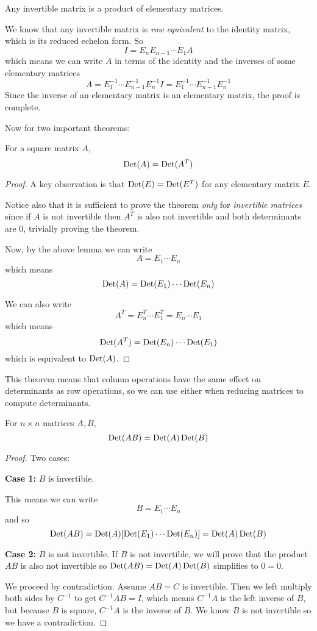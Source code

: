 \begin{lemma}
Any invertible matrix is a product of elementary matrices.
\end{lemma}

\begin{lproof}
We know that any invertible matrix is \textit{row equivalent} to the identity matrix, which is its reduced echelon form. So 
$$I = E_{n} E_{n-1} \cdots E_{1} A$$
which means we can write $A$ in terms of the identity and the inverses of some elementary  matrices 
$$A = E_{1}^{-1} \cdots E_{n-1}^{-1} E_{n}^{-1} I = E_{1}^{-1} \cdots E_{n-1}^{-1} E_{n}^{-1}$$
Since the inverse of an elementary matrix is an elementary matrix, the proof is complete. 
\end{lproof} 

Now for two important theorems:

\begin{theorem}
For a square matrix $A$, 
$$\operatorname{Det}(A) = \operatorname{Det}(A^{T})$$
\end{theorem}

\begin{proof}
A key observation is that $\operatorname{Det}(E) = \operatorname{Det}(E^{T})$ for any elementary matrix $E$. 

Notice also that it is sufficient to prove the theorem \textit{only} for \textit{invertible matrices} since if $A$ is not invertible then $A^{T}$ is also not invertible and both determinants are 0, trivially proving the theorem. 

Now, by the above lemma we can write
$$A = E_{1} \cdots E_{n}$$
which means 
$$\operatorname{Det}(A) = \operatorname{Det}(E_{1}) \cdots \operatorname{Det}(E_{n})$$

We can also write 
$$A^{T} = E_{n}^{T} \cdots E_{1}^{T} = E_{n} \cdots E_{1}$$
which means 
$$\operatorname{Det}(A^{T}) = \operatorname{Det}(E_{n}) \cdots \operatorname{Det}(E_{1})$$
which is equivalent to $\operatorname{Det}(A)$. 
\end{proof}

This theorem means that column operations have the same effect on determinants as row operations, so we can use either when reducing matrices to compute determinants. 

\begin{theorem}
For $n \times n$ matrices $A, B$, 
$$\operatorname{Det}(AB) = \operatorname{Det}(A) \operatorname{Det}(B)$$
\end{theorem}

\begin{proof}
Two cases: 

\textbf{Case 1: } $B$ is invertible. 

This means we can write 
$$B = E_{1} \cdots E_{n}$$
and so 
$$\operatorname{Det}(AB) = \operatorname{Det}(A)[\operatorname{Det}(E_{1}) \cdots \operatorname{Det}(E_{n})] = \operatorname{Det}(A) \operatorname{Det}(B)$$

\textbf{Case 2: } $B$ is not invertible. 
If $B$ is not invertible, we will prove that the product $AB$ is also not invertible so $\operatorname{Det}(AB) = \operatorname{Det}(A) \operatorname{Det}(B)$ simplifies to $0 = 0$. 

We proceed by contradiction. Assume $AB = C$ is invertible. Then we left multiply both sides by $C^{-1}$ to get $C^{-1} AB = I$, which means $C^{-1}A$ is the left inverse of $B$, but because $B$ is square, $C^{-1}A$ is the inverse of $B$. We know $B$ is not invertible so we have a contradiction. 
\end{proof}

